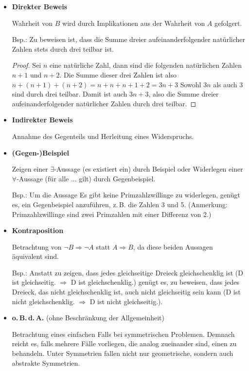 \begin{itemize}
	\item \textbf{Direkter Beweis}
	
Wahrheit von $B$ wird durch Implikationen aus der Wahrheit von $A$ gefolgert.
	
Bsp.: Zu beweisen ist, dass die Summe dreier aufeinanderfolgender nat{\"u}rlicher Zahlen stets durch drei teilbar ist.
\begin{proof}
Sei $n$ eine nat{\"u}rliche Zahl, dann sind die folgenden nat{\"u}rlichen Zahlen $n+1$ und $n+2$.
Die Summe dieser drei Zahlen ist also $n+(n+1)+(n+2)=n+n+n+1+2=3n+3$
Sowohl $3n$ als auch $3$ sind durch drei teilbar.
Damit ist auch $3n+3$, also die Summe dreier aufeinanderfolgender nat{\"u}rlicher Zahlen durch drei teilbar.
\end{proof}
	\item \textbf{Indirekter Beweis}	

Annahme des Gegenteils und Herleitung eines Widerspruchs.
	\item \textbf{(Gegen-)Beispiel}
	
Zeigen einer $\exists$-Aussage (\glqq es existiert ein\grqq) durch Beispiel oder Widerlegen einer $\forall$-Aussage (\glqq f{\"u}r alle ... gilt\grqq) durch Gegenbeispiel.
	
Bsp.: Um die Aussage {\glqq Es gibt keine Primzahlzwillinge\grqq} zu widerlegen, gen{\"u}gt es, ein Gegenbeispiel anzuf{\"u}hren, z.\,B. die Zahlen 3 und 5. (Anmerkung: Primzahlzwillinge sind zwei Primzahlen mit einer Differenz von 2.)
	\item \textbf{Kontraposition}

Betrachtung  von  $\neg B \Rightarrow \neg A$ statt $A \Rightarrow B$, da diese beiden Aussagen {\"a}quivalent sind.

Bsp.: Anstatt zu zeigen, dass jedes gleichseitige Dreieck gleichschenklig ist ({\glqq D ist gleichseitig.\grqq} $\Rightarrow$ {\glqq D ist gleichschenklig.\grqq}) gen{\"u}gt es, zu beweisen, dass jedes Dreieck, das nicht gleichschenklig ist, auch nicht gleichseitig sein kann ({\glqq D ist nicht gleichschenklig.\grqq} $\Rightarrow$ {\glqq D ist nicht gleichseitig.\grqq}).
	\item \textbf{o.\,B.\,d.\,A.} (ohne Beschr{\"a}nkung der Allgemeinheit)
	
Betrachtung eines einfachen Falls bei symmetrischen Problemen. Demnach reicht es, falls mehrere F{\"a}lle vorliegen, die analog zueinander sind, einen zu behandeln. Unter Symmetrien fallen nicht nur geometrische, sondern auch abstrakte Symmetrien.


\end{itemize}

